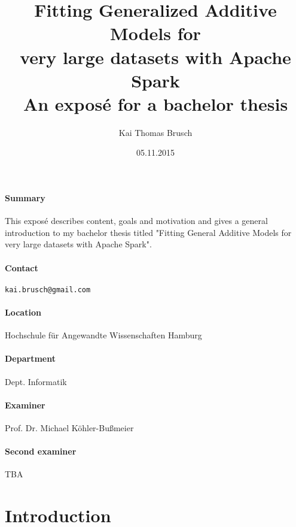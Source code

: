 \documentclass{article}
\title{
    Fitting Generalized Additive Models for\\ very large datasets with Apache Spark \\[7pt]
    \large An exposé for a bachelor thesis
}
\date{05.11.2015}
\author{Kai Thomas Brusch}
\begin{document}

    \maketitle

    \paragraph{Summary}

    This exposé describes content, goals and motivation and gives a general introduction to my bachelor thesis titled "Fitting General Additive Models for very large datasets with Apache Spark".

    \paragraph{Contact} \texttt{kai.brusch@gmail.com}

    \paragraph{Location} Hochschule für Angewandte Wissenschaften Hamburg
    \paragraph{Department} Dept. Informatik
    \paragraph{Examiner} Prof. Dr. Michael Köhler-Bußmeier
    \paragraph{Second examiner} TBA

    \newpage

    \tableofcontents

    \newpage

    \section{Introduction}
\end{document}
